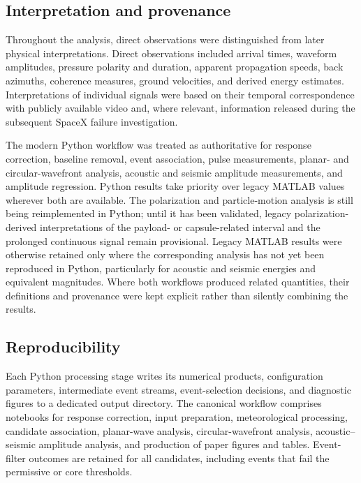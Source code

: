 \documentclass[]{seismica}
\begin{document}
\subsection{Interpretation and provenance}

Throughout the analysis, direct observations were distinguished from later physical interpretations. Direct observations included arrival times, waveform amplitudes, pressure polarity and duration, apparent propagation speeds, back azimuths, coherence measures, ground velocities, and derived energy estimates. Interpretations of individual signals were based on their temporal correspondence with publicly available video and, where relevant, information released during the subsequent SpaceX failure investigation.

The modern Python workflow was treated as authoritative for response
correction, baseline removal, event association, pulse measurements, planar-
and circular-wavefront analysis, acoustic and seismic amplitude measurements,
and amplitude regression. Python results take priority over legacy MATLAB
values wherever both are available. The polarization and particle-motion
analysis is still being reimplemented in Python; until it has been validated,
legacy polarization-derived interpretations of the payload- or capsule-related
interval and the prolonged continuous signal remain provisional. Legacy MATLAB
results were otherwise retained only where the corresponding analysis has not
yet been reproduced in Python, particularly for acoustic and seismic energies
and equivalent magnitudes. Where both workflows produced related quantities,
their definitions and provenance were kept explicit rather than silently
combining the results.

\subsection{Reproducibility}

Each Python processing stage writes its numerical products, configuration parameters, intermediate event streams, event-selection decisions, and diagnostic figures to a dedicated output directory. The canonical workflow comprises notebooks for response correction, input preparation, meteorological processing, candidate association, planar-wave analysis, circular-wavefront analysis, acoustic--seismic amplitude analysis, and production of paper figures and tables. Event-filter outcomes are retained for all candidates, including events that fail the permissive or core thresholds.
\end{document}
